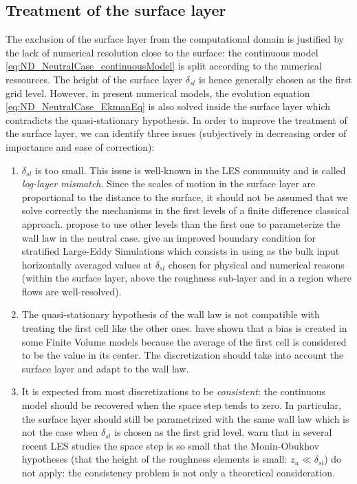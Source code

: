 \subsection{Treatment of the surface layer}
\label{sec:ND_Intro_treatmentSL}
The exclusion of the surface layer from the computational
domain is justified by the lack of numerical resolution
close to the surface: the continuous model
\eqref{eq:ND_NeutralCase_continuousModel} is split
according to the numerical ressources. The height
of the surface layer $\delta_{sl}$ is hence generally chosen as the
first grid level.
However, in present numerical models,
the evolution equation \eqref{eq:ND_NeutralCase_EkmanEq}
is also solved inside the surface layer which contradicts the
quasi-stationary hypothesis.
In order to improve the treatment of the surface layer,
we can identify three issues (subjectively in decreasing
order of importance and ease of correction):
\begin{enumerate}
	\item $\delta_{sl}$ is too small. This issue is well-known
		in the LES community and is called
		\textit{log-layer mismatch}.
		Since the scales of motion
		in the surface layer are proportional to the distance
		to the surface, it should not be assumed that we solve
		correctly the mechanisms in the first levels
		of a finite difference classical approach.
		\cite{kawai_wall-modeling_2012} propose to use other
		levels than the first one to parameterize the
		wall law in the neutral case.
		\cite{maronga_improved_2020} give an improved
		boundary condition for stratified Large-Eddy Simulations
		which consists in using as the bulk input
		horizontally averaged values at
		$\delta_{sl}$ chosen for physical and numerical
		reasons (within the surface layer, above the
		roughness sub-layer and in a region where flows are
		well-resolved).
	\item The quasi-stationary hypothesis of the wall law is
		not compatible with treating the first cell like
		the other ones.
		\cite{nishizawa_surface_2018} have shown that a
		bias is created in some Finite Volume models
		because the average of the first cell is considered
		to be the value in its center.
		The discretization should take into account the
		surface layer and adapt to the wall law.
	\item It is expected from most discretizations to be
		\textit{consistent}: the continuous
		model should be recovered when the space step tends
		to zero.  In particular, the surface layer should
		still be parametrized with the same wall law which
		is not the case when $\delta_{sl}$ is chosen
		as the first grid
		level. \cite{basu_cautionary_2017} warn that
		in several recent LES studies the space step is
		so small that the Monin-Obukhov hypotheses
		(that the height of the roughness elements is small:
		$z_u \ll \delta_{sl}$)
		do not apply: the consistency problem is not only
		a theoretical consideration.
\end{enumerate}
